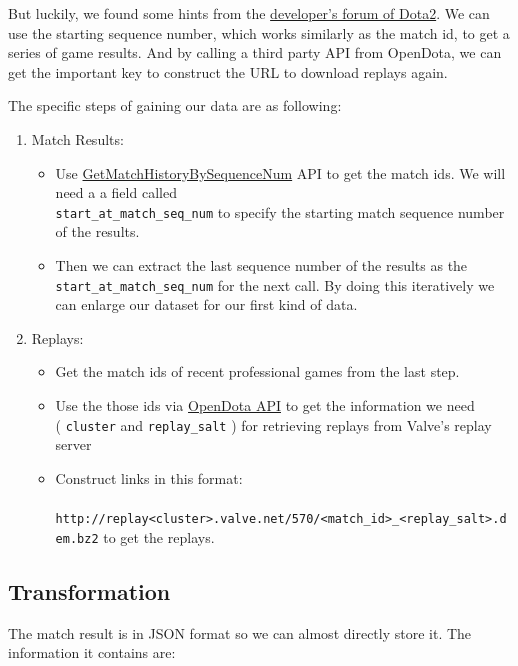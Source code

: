 \documentclass{article}
\newcommand{\codeinline}[1]{
	\texttt{#1}
}
\begin{document}
But luckily, we found some hints from the \href{https://dev.dota2.com}{developer's forum of Dota2}.
We can use the starting sequence number, which works similarly as the match id, to get a series of game results.
And by calling a third party API from OpenDota, we can get the important key to construct the URL to download replays again.

The specific steps of gaining our data are as following:

\begin{enumerate}
\item Match Results:
	\begin{itemize}
		\item Use \href{https://wiki.teamfortress.com/wiki/WebAPI/GetMatchHistoryBySequenceNum}{GetMatchHistoryBySequenceNum} API to get the match ids. We will need a a field called \\ \codeinline{start_at_match_seq_num} to specify the starting match sequence number of the results.
		\item Then we can extract the last sequence number of the results as the \codeinline{start_at_match_seq_num} for the next call. By doing this iteratively we can enlarge our dataset for our first kind of data.
	\end{itemize}
\item Replays:
	\begin{itemize}
		\item Get the match ids of recent professional games from the last step.
		\item Use the those ids via \href{https://docs.opendota.com/#tag/matches}{OpenDota API} to get the information we need \\ (\codeinline{cluster} and \codeinline{replay_salt}) for retrieving replays from Valve's replay server
		\item Construct links in this format:\\  \codeinline{ http://replay<cluster>.valve.net/570/<match_id>_<replay_salt>.dem.bz2} to get the replays.
	\end{itemize}
\end{enumerate}


\subsection{Transformation}

The match result is in JSON format so we can almost directly store it. The information it contains are:
\end{document}
